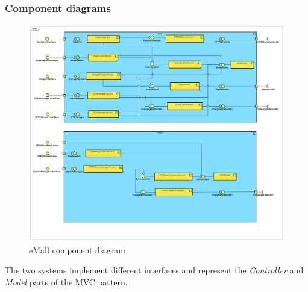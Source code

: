 \subsubsection{Component diagrams}
\begin{figure}[!h]
    \begin{center}
        \includegraphics[keepaspectratio, width=16cm]{Component/Component.png}
        \caption{eMall component diagram}
        \label{fig:eMSP-component}
    \end{center}
\end{figure}
\clearpage
{}
The two systems implement different interfaces and represent the \textit{Controller} and \textit{Model} parts of the \ac{MVC} pattern.

